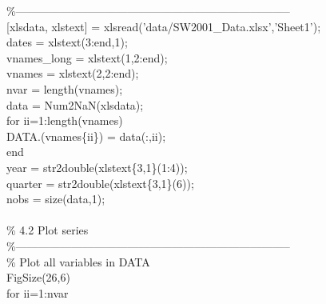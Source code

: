\hspace{1mm}\textcolor{matlabgreen}{\%--------------------------------------------------------------------------  }\\ 
\hspace{1mm}[xlsdata, xlstext] = xlsread(\textcolor{matlabpurple}{'data/SW2001\_Data.xlsx'},\textcolor{matlabpurple}{'Sheet1'}); \\ 
\hspace{1mm}dates = xlstext(3:end,1); \\ 
\hspace{1mm}vnames\_long = xlstext(1,2:end); \\ 
\hspace{1mm}vnames = xlstext(2,2:end); \\ 
\hspace{1mm}nvar = length(vnames); \\ 
\hspace{1mm}data   = Num2NaN(xlsdata); \\ 
\hspace{1mm}\textcolor{matlabblue}{for} ii=1:length(vnames) \\ 
\hspace{1mm}\hspace{5mm} DATA.(vnames\{ii\}) = data(:,ii); \\ 
\hspace{1mm}\textcolor{matlabblue}{end} \\ 
\hspace{1mm}year = str2double(xlstext\{3,1\}(1:4)); \\ 
\hspace{1mm}quarter = str2double(xlstext\{3,1\}(6)); \\ 
\hspace{1mm}nobs = size(data,1); \\ 
\hspace{1mm} \\ 
\hspace{1mm}\textcolor{matlabgreen}{\% 4.2 Plot series }\\ 
\hspace{1mm}\textcolor{matlabgreen}{\%--------------------------------------------------------------------------  }\\ 
\hspace{1mm}\textcolor{matlabgreen}{\% Plot all variables in DATA }\\ 
\hspace{1mm}FigSize(26,6) \\ 
\hspace{1mm}\textcolor{matlabblue}{for} ii=1:nvar \\ 
